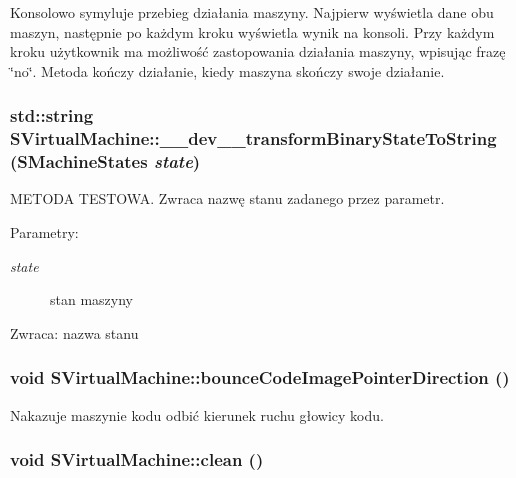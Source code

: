 Konsolowo symyluje przebieg działania maszyny. Najpierw wyświetla dane obu maszyn, następnie po każdym kroku wyświetla wynik na konsoli. Przy każdym kroku użytkownik ma możliwość zastopowania działania maszyny, wpisując frazę \char`\"{}no\char`\"{}. Metoda kończy działanie, kiedy maszyna skończy swoje działanie. \hypertarget{classSVirtualMachine_f8e1ef67bff80a4ce0aa7afc741a1a93}{
\subsubsection[{\_\-\_\-dev\_\-\_\-transformBinaryStateToString}]{\setlength{\rightskip}{0pt plus 5cm}std::string SVirtualMachine::\_\-\_\-dev\_\-\_\-transformBinaryStateToString ({\bf SMachineStates} {\em state})}}
\label{classSVirtualMachine_f8e1ef67bff80a4ce0aa7afc741a1a93}


METODA TESTOWA. Zwraca nazwę stanu zadanego przez parametr. \begin{Desc}
\item[Parametry:]
\begin{description}
\item[{\em state}]stan maszyny \end{description}
\end{Desc}
\begin{Desc}
\item[Zwraca:]nazwa stanu \end{Desc}
\hypertarget{classSVirtualMachine_0df11160e4aae2743ed39c65ea6d8441}{
\subsubsection[{bounceCodeImagePointerDirection}]{\setlength{\rightskip}{0pt plus 5cm}void SVirtualMachine::bounceCodeImagePointerDirection ()}}
\label{classSVirtualMachine_0df11160e4aae2743ed39c65ea6d8441}


Nakazuje maszynie kodu odbić kierunek ruchu głowicy kodu. \hypertarget{classSVirtualMachine_85f2b4a688a077283010a11145289110}{
\subsubsection[{clean}]{\setlength{\rightskip}{0pt plus 5cm}void SVirtualMachine::clean ()}}
\label{classSVirtualMachine_85f2b4a688a077283010a11145289110}


